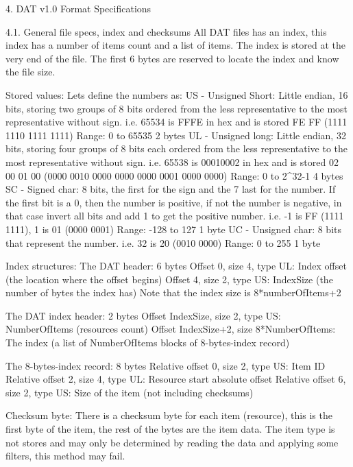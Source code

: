 4. DAT v1.0 Format Specifications
   ~~~ ~~~~ ~~~~~~ ~~~~~~~~~~~~~~

4.1. General file specs, index and checksums
 All DAT files has an index, this index has a number of items count and
 a list of items.
 The index is stored at the very end of the file.
 The first 6 bytes are reserved to locate the index and know the file size.

 Stored values:
 Lets define the numbers as:
  US - Unsigned Short: Little endian, 16 bits, storing two groups of 8 bits
       ordered from the less representative to the most representative
       without sign.
       i.e. 65534 is FFFE in hex and is stored FE FF (1111 1110 1111 1111)
       Range: 0 to 65535
       2 bytes
  UL - Unsigned long: Little endian, 32 bits, storing four groups of 8 bits
       each ordered from the less representative to the most representative
       without sign.
       i.e. 65538 is 00010002 in hex and is stored 02 00 01 00
       (0000 0010 0000 0000 0000 0001 0000 0000)
       Range: 0 to 2^32-1
       4 bytes
  SC - Signed char: 8 bits, the first for the sign and the 7 last for the
       number. If the first bit is a 0, then the number is positive, if not
       the number is negative, in that case invert all bits and add 1 to
       get the positive number.
       i.e. -1 is FF (1111 1111), 1 is 01 (0000 0001)
       Range: -128 to 127
       1 byte
  UC - Unsigned char: 8 bits that represent the number.
       i.e. 32 is 20 (0010 0000)
       Range: 0 to 255
       1 byte

 Index structures:
 The DAT header: 6 bytes
  Offset 0, size 4, type UL: Index offset (the location where the offset
                             begins)
  Offset 4, size 2, type US: IndexSize (the number of bytes the index has)
                             Note that the index size is 8*numberOfItems+2

 The DAT index header: 2 bytes
  Offset IndexSize, size 2, type US: NumberOfItems (resources count)
  Offset IndexSize+2, size 8*NumberOfItems: The index (a list of
                              NumberOfItems blocks of 8-bytes-index record)

 The 8-bytes-index record: 8 bytes
  Relative offset 0, size 2, type US: Item ID
  Relative offset 2, size 4, type UL: Resource start absolute offset
  Relative offset 6, size 2, type US: Size of the item (not including
                                      checksums)

 Checksum byte:
 There is a checksum byte for each item (resource), this is the first byte
 of the item, the rest of the bytes are the item data. The item type is not
 stores and may only be determined by reading the data and applying some
 filters, this method may fail.


